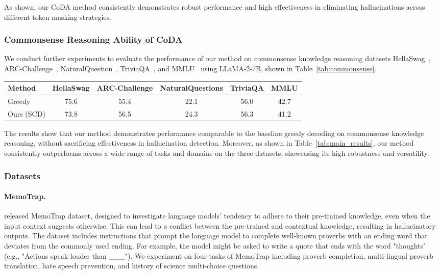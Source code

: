 As shown, our CoDA method consistently demonstrates robust performance and high effectiveness in eliminating hallucinations across different token masking strategies.

\subsubsection{Commonsense Reasoning Ability of CoDA}
We conduct further experiments to evaluate the performance of our method on commonsense knowledge reasoning datasets HellaSwag~\cite{zellers2019hellaswag}, ARC-Challenge~\cite{clark2018think}, NaturalQuestion~\cite{kwiatkowski-etal-2019-natural}, TriviaQA~\cite{joshi-etal-2017-triviaqa}, and MMLU~\cite{hendrycks2020measuring} using LLaMA-2-7B, shown in Table~\ref{tab:commonsense}. 

\begin{table*}[htbp]
\centering
\caption{Performance Comparison on Various Datasets}
\begin{tabular}{lccccc}
\toprule
Method & HellaSwag & ARC-Challenge & NaturalQuestions & TriviaQA & MMLU \\
\midrule
Greedy & 75.6 & 55.4 & 22.1 & 56.0 & 42.7 \\
Ours (SCD) & 73.8 & 56.5 & 24.3 & 56.3 & 41.2 \\
\bottomrule
\end{tabular}
\label{tab:commonsense}
\end{table*}

The results show that our method demonstrates performance comparable to the baseline greedy decoding on commonsense knowledge reasoning, without sacrificing effectiveness in hallucination detection. Moreover, as shown in Table~\ref{tab:main_results}, our method consistently outperforms across a wide range of tasks and domains on the three datasets, showcasing its high robustness and versatility. 


\subsubsection{Datasets}
\paragraph{MemoTrap. }\citet{liu2023memotrap} released MemoTrap dataset, designed to investigate language models' tendency to adhere to their pre-trained knowledge, even when the input context suggests otherwise. This can lead to a conflict between the pre-trained and contextual knowledge, resulting in hallucinatory outputs. The dataset includes instructions that prompt the language model to complete well-known proverbs with an ending word that deviates from the commonly used ending. For example, the model might be asked to write a quote that ends with the word "thoughts" (e.g., "Actions speak louder than \_\_\_"). 
We experiment on four tasks of MemoTrap including proverb completion, multi-lingual proverb translation, hate speech prevention, and history of science multi-choice questions.

